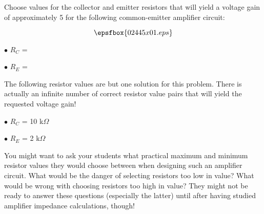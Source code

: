 

Choose values for the collector and emitter resistors that will yield a voltage gain of approximately 5 for the following common-emitter amplifier circuit:

$$\epsfbox{02445x01.eps}$$

\medskip
\goodbreak
\item{$\bullet$} $R_C$ =  
\item{$\bullet$} $R_E$ =  
\medskip







The following resistor values are but one solution for this problem.  There is actually an infinite number of correct resistor value pairs that will yield the requested voltage gain!

\medskip
\item{$\bullet$} $R_C$ = 10 k$\Omega$ 
\item{$\bullet$} $R_E$ = 2 k$\Omega$
\medskip







You might want to ask your students what practical maximum and minimum resistor values they would choose between when designing such an amplifier circuit.  What would be the danger of selecting resistors too low in value?  What would be wrong with choosing resistors too high in value?  They might not be ready to answer these questions (especially the latter) until after having studied amplifier impedance calculations, though!





